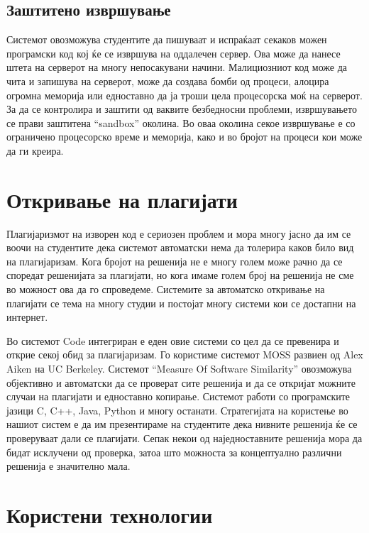 \documentclass[a4paper,twocolumn]{article}
\begin{document}
\subsection{Заштитено извршување}

Системот овозможува студентите да пишуваат и испраќаат секаков можен програмски
код кој ќе се извршува на оддалечен сервер. Ова може да нанесе штета на серверот
на многу непосакувани начини. Малициозниот код може да чита и запишува на
серверот, може да создава бомби од процеси, алоцира огромна меморија или
едноставно да ја троши цела процесорска моќ на серверот. За да се контролира и
заштити од ваквите безбедносни проблеми, извршувањето се прави заштитена
“sandbox” околина. Во оваа околина секое извршување е со ограничено процесорско
време и меморија, како и во бројот на процеси кои може да ги креира.

\section{Откривање на плагијати}
    
 Плагијаризмот на изворен код е сериозен проблем и мора многу јасно да им се
 воочи на студентите дека системот автоматски нема да толерира каков било вид на
 плагијаризам. Кога бројот на решенија не е многу голем може рачно да се
 споредат решенијата за плагијати, но кога имаме голем број на решенија не сме
 во можност ова да го спроведеме. Системите за автоматско откривање на плагијати
 се тема на многу студии и постојат многу системи кои се достапни на интернет.
 
Во системот Code интегриран е еден овие системи со цел да се превенира и открие
секој обид за плагијаризам. Го користиме системот MOSS развиен од Alex Aiken на
UC Berkeley. Системот “Measure Of Software Similarity” овозможува објективно и
автоматски да се проверат сите решенија и да се откријат можните случаи на
плагијати и едноставно копирање. Системот работи со програмските јазици C, C++,
Java, Python и многу останати. Стратегијата на користење во нашиот систем е да
им презентираме на студентите дека нивните решенија ќе се проверуваат дали се
плагијати. Сепак некои од наједноставните решенија мора да бидат исклучени од
проверка, затоа што можноста за концептуално различни решенија е значително
мала.

\section{Користени технологии}
\end{document}
